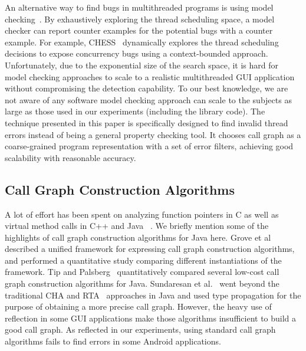 An alternative way to find bugs in multithreaded programs is using model checking~\cite{Nori:2010:ESO, Inverardi:2000, Siegel:2008}.
By exhaustively exploring the thread scheduling space, a model checker can
report counter examples for the potential bugs with a counter example. For example,
CHESS~\cite{chess} dynamically explores the thread scheduling decisions to expose
concurrency bugs using a context-bounded approach. 
Unfortunately, due to the exponential size of the search space,
 it is hard for model checking approaches to scale to a realistic multithreaded GUI application
 without compromising the detection capability. To our best knowledge,
we are not aware of any software model checking approach can scale to the subjects
as large as those used in our experiments (including the library code).
The technique presented in this paper is specifically designed to find invalid thread
errors instead of being a general property checking tool. 
It chooses call graph as a coarse-grained program representation with a
set of error filters, achieving good scalability with reasonable accuracy.


\tinystep

\subsection{Call Graph Construction Algorithms}

A lot of effort has been spent on analyzing function pointers in C
as well as virtual method calls in C++ and Java ~\cite{rta, kcfa,
xta, inccg, Sundaresan:2000}.
We briefly mention some of the highlights of call graph construction
algorithms for Java here. Grove et al~\cite{kcfa} described a unified
framework for expressing call graph construction algorithms, and
performed a quantitative study comparing different instantiations
of the framework. Tip and Palsberg~\cite{xta} quantitatively compared
several low-cost call graph construction algorithms for Java.
Sundaresan et al.~\cite{Sundaresan:2000} went beyond the traditional
CHA and RTA~\cite{rta} approaches in Java and used type propagation
for the purpose of obtaining a more precise call graph.
However, the heavy use of reflection in some GUI applications make
those algorithms insufficient to build a good call graph.
As reflected in our experiments, using standard call graph algorithms
fails to find errors in some
Android applications. %


